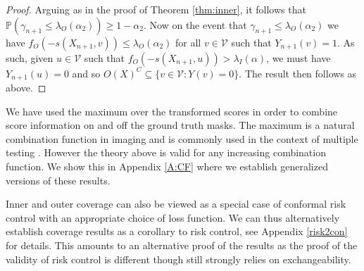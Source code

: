 \begin{proof}
	Arguing as in the proof of Theorem \ref{thm:inner}, it follows that $\mathbb{P}\left(\gamma_{n+1} \leq \lambda_O(\alpha_2) \right) \geq 1 - \alpha_2.$
	Now on the event that $\gamma_{n+1}\leq \lambda_O(\alpha_2)$ we have $ f_O(-s(X_{n+1},v)) \leq \lambda_O(\alpha_2) $ for all $v \in \mathcal{V}$ such that $Y_{n+1}(v) = 1$. As such, given $u \in \mathcal{V}$ such that $ f_O(-s(X_{n+1},u)) > \lambda_I(\alpha) $, we must have $Y_{n+1}(u) = 0$ and so $	O(X)^C  \subseteq \lbrace v\in \mathcal{V}: Y(v) = 0 \rbrace  $. The result then follows as above.
\end{proof}
\begin{remark}\label{rmk:max}
	We have used the maximum over the transformed scores in order to combine score information on and off the ground truth masks. The maximum is a natural combination function in imaging and is commonly used in the context of multiple testing \citep{Worsley1992}. However the theory above is valid for any increasing combination function. We show this in Appendix \ref{A:CF} where we establish generalized versions of these results.
\end{remark}
\begin{remark}
	Inner and outer coverage can also be viewed as a special case of conformal risk control with an appropriate choice of loss function. We can thus alternatively establish coverage results as a corollary to risk control, see Appendix \ref{risk2con} for details. This amounts to an alternative proof of the results as the proof of the validity of risk control is different though still strongly relies on exchangeability.
\end{remark}


